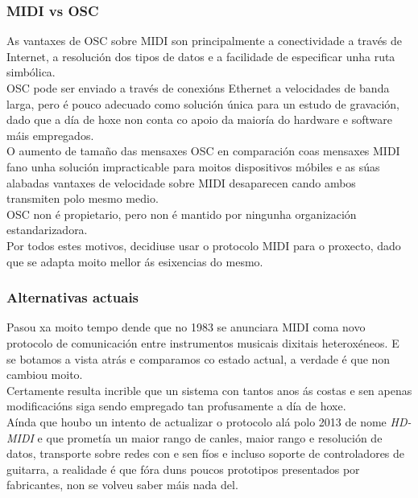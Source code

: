   \subsubsection{MIDI vs OSC}

  As vantaxes de OSC sobre MIDI son principalmente a conectividade a través de
  Internet, a resolución dos tipos de datos e a facilidade de especificar unha
  ruta simbólica. \\

  OSC pode ser enviado a través de conexións Ethernet a velocidades de banda
  larga, pero é pouco adecuado como solución única para un estudo de gravación,
  dado que a día de hoxe non conta co apoio da maioría do hardware e software
  máis empregados. \\

  O aumento de tamaño das mensaxes OSC en comparación coas mensaxes MIDI fano
  unha solución impracticable para moitos dispositivos móbiles e as súas
  alabadas vantaxes de velocidade sobre MIDI desaparecen cando ambos transmiten
  polo mesmo medio. \\

  OSC non é propietario, pero non é mantido por ningunha organización
  estandarizadora. \\

  Por todos estes motivos, decidiuse usar o protocolo MIDI para o proxecto,
  dado que se adapta moito mellor ás esixencias do mesmo.
  
  \subsubsection{Alternativas actuais}
  
  Pasou xa moito tempo dende que no 1983 se anunciara MIDI coma novo protocolo
  de comunicación entre instrumentos musicais dixitais heteroxéneos. E se
  botamos a vista atrás e comparamos co estado actual, a verdade é que non
  cambiou moito. \\
  
  Certamente resulta incrible que un sistema con tantos anos ás costas e sen
  apenas modificacións siga sendo empregado tan profusamente a día de hoxe. \\
  
  Aínda que houbo un intento de actualizar o protocolo alá polo 2013
  de nome \textit{HD-MIDI} \cite{HDMIDI} e que prometía un maior rango de
  canles, maior rango e resolución de datos, transporte sobre redes con e sen
  fíos e incluso soporte de controladores de guitarra, a realidade é que fóra
  duns poucos prototipos presentados por fabricantes, non se volveu saber máis
  nada del. \\
  
